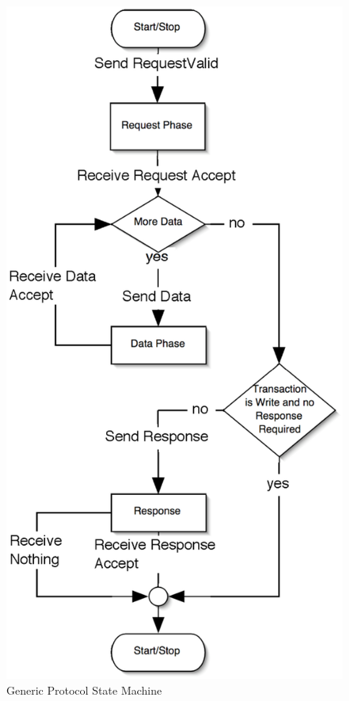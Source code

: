 \documentclass[12pt,oneside]{gsbook}
\begin{document}
\begin{figure}[htbp]
        \centering
        \includegraphics[scale=0.7]{GenericSM.eps}
        \caption{Generic Protocol State Machine}
        \label{fig:genericsm}
\end{figure}
\end{document}
